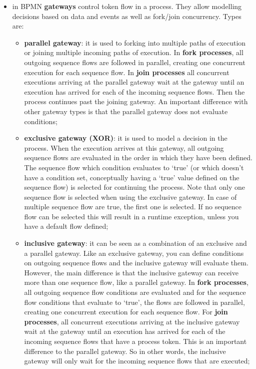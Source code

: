 \documentclass[oneside]{article}
\begin{document}
\begin{itemize}
    \item in BPMN \textbf{gateways} control token flow in a process. They allow modelling decisions based on data and events as well as fork/join concurrency. Types are:
        \begin{itemize}
            \item \textbf{parallel gateway}: it is used to forking into multiple paths of execution or joining multiple incoming paths of execution. In \textbf{fork processes},  all outgoing sequence flows are followed in parallel, creating one concurrent execution for each sequence flow. In \textbf{join processes} all concurrent executions arriving at the parallel gateway wait at the gateway until an execution has arrived for each of the incoming sequence flows. Then the process continues past the joining gateway. An important difference with other gateway types is that the parallel gateway does not evaluate conditions;
            \item \textbf{exclusive gateway (XOR)}: it is used to model a decision in the process. When the execution arrives at this gateway, all outgoing sequence flows are evaluated in the order in which they have been defined. The sequence flow which condition evaluates to ‘true’ (or which doesn't have a condition set, conceptually having a ‘true’ value defined on the sequence flow) is selected for continuing the process. Note that only one sequence flow is selected when using the exclusive gateway. In case of multiple sequence flow are true, the first one is selected. If no sequence flow can be selected this will result in a runtime exception, unless you have a default flow defined;
            \item \textbf{inclusive gateway}: it can be seen as a combination of an exclusive and a parallel gateway. Like an exclusive gateway, you can define conditions on outgoing sequence flows and the inclusive gateway will evaluate them. However, the main difference is that the inclusive gateway can receive more than one sequence flow, like a parallel gateway. In \textbf{fork processes}, all outgoing sequence flow conditions are evaluated and for the sequence flow conditions that evaluate to ‘true’, the flows are followed in parallel, creating one concurrent execution for each sequence flow. For \textbf{join processes}, all concurrent executions arriving at the inclusive gateway wait at the gateway until an execution has arrived for each of the incoming sequence flows that have a process token. This is an important difference to the parallel gateway. So in other words, the inclusive gateway will only wait for the incoming sequence flows that are executed;
        \end{itemize}
        

\end{itemize}
\end{document}

